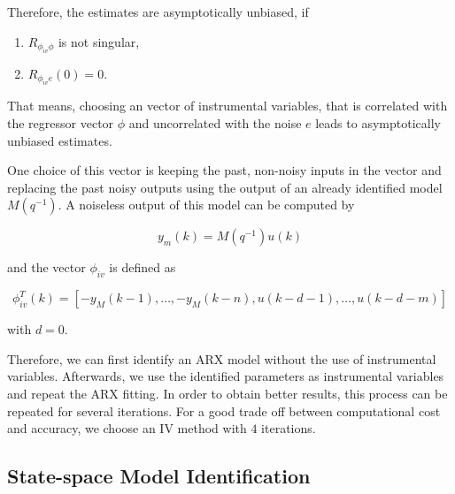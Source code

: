 \documentclass{scrartcl}
\newcommand*{\matlabcode}[3]{\begin{figure}[h!]\end{figure}}
\begin{document}
Therefore, the estimates are asymptotically unbiased, if 
\begin{enumerate}
\item $R_{\phi_{iv} \phi}$ is not singular,
\item $R_{\phi_{iv} e }(0) = 0$.
\end{enumerate}

That means, choosing an vector of instrumental variables, that is correlated with the regressor vector $\phi$ and uncorrelated with the noise $e$ leads to asymptotically unbiased estimates.

One choice of this vector is keeping the past, non-noisy inputs in the vector and replacing the past noisy outputs using the output of an already identified model $M(q^{-1})$. A noiseless output of this model can be computed by 

\begin{equation}
y_m(k) = M(q^{-1}) u(k)
\end{equation}

and the vector $\phi_{iv}$ is defined as

\begin{equation}
\phi_{iv}^T(k) = \left[-y_M(k-1),\ldots,-y_M(k-n),u(k-d-1),\ldots,u(k-d-m)\right]
\end{equation}

with $d=0$. 

Therefore, we can first identify an ARX model without the use of instrumental variables. Afterwards, we use the identified parameters as instrumental variables and repeat the ARX fitting.
In order to obtain better results, this process can be repeated for several iterations. For a good trade off between computational cost and accuracy, we choose an IV method with $4$ iterations. 


\matlabcode{../matlab/ce2/ARX_model_identification.m}{Matlab function for the ARX model identification technique including the instrumental variables method.}{lst:ARX}


\clearpage
\subsection{State-space Model Identification}
\end{document}
